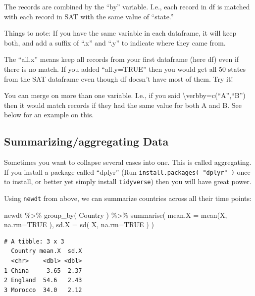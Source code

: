 \documentclass[
  letterpaper,
  DIV=11,
  numbers=noendperiod]{scrreprt}
\newenvironment{Shaded}{}{}
\newcommand{\AttributeTok}[1]{\textcolor[rgb]{0.49,0.56,0.16}{#1}}
\newcommand{\ConstantTok}[1]{\textcolor[rgb]{0.53,0.00,0.00}{#1}}
\newcommand{\FunctionTok}[1]{\textcolor[rgb]{0.02,0.16,0.49}{#1}}
\newcommand{\NormalTok}[1]{#1}
\newcommand{\SpecialCharTok}[1]{\textcolor[rgb]{0.25,0.44,0.63}{#1}}
\begin{document}
The records are combined by the ``by'' variable. I.e., each record in df
is matched with each record in SAT with the same value of ``state.''

Things to note: If you have the same variable in each dataframe, it will
keep both, and add a suffix of ``.x'' and ``.y'' to indicate where they
came from.

The ``all.x'' means keep all records from your first dataframe (here df)
even if there is no match. If you added ``all.y=TRUE'' then you would
get all 50 states from the SAT dataframe even though df doesn't have
most of them. Try it!

You can merge on more than one variable. I.e., if you said
\textbackslash verb\textbar by=c(``A'',``B'')\textbar{} then it would
match records if they had the same value for both A and B. See below for
an example on this.

\subsection{Summarizing/aggregating
Data}\label{summarizingaggregating-data}

Sometimes you want to collapse several cases into one. This is called
aggregating. If you install a package called ``dplyr'' (Run
\texttt{install.packages(\ "dplyr"\ )} once to install, or better yet
simply install \texttt{tidyverse}) then you will have great power.

Using \texttt{newdt} from above, we can summarize countries across all
their time points:

\begin{Shaded}
\begin{Highlighting}[]
\NormalTok{newdt }\SpecialCharTok{\%\textgreater{}\%} \FunctionTok{group\_by}\NormalTok{( Country ) }\SpecialCharTok{\%\textgreater{}\%} 
    \FunctionTok{summarise}\NormalTok{( }\AttributeTok{mean.X =} \FunctionTok{mean}\NormalTok{(X, }\AttributeTok{na.rm=}\ConstantTok{TRUE}\NormalTok{ ),}
        \AttributeTok{sd.X =} \FunctionTok{sd}\NormalTok{( X, }\AttributeTok{na.rm=}\ConstantTok{TRUE}\NormalTok{ ) )}
\end{Highlighting}
\end{Shaded}

\begin{verbatim}
# A tibble: 3 x 3
  Country mean.X  sd.X
  <chr>    <dbl> <dbl>
1 China     3.65  2.37
2 England  54.6   2.43
3 Morocco  34.0   2.12
\end{verbatim}
\end{document}
